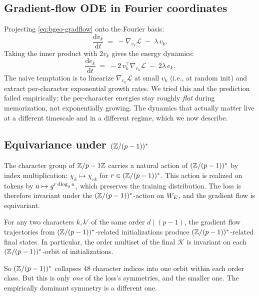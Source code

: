 \subsection{Gradient-flow ODE in Fourier coordinates}
\label{subsec:bgeo-flow}

Projecting \eqref{eq:bgeo-gradflow} onto the Fourier basis:
\begin{equation}
  \frac{\mathrm d v_k}{\mathrm d t} \;=\; -\nabla_{v_k} \mathcal L \;-\; \lambda\, v_k.
  \label{eq:bgeo-vdot}
\end{equation}
Taking the inner product with $2 v_k$ gives the energy dynamics:
\begin{equation}
  \frac{\mathrm d e_k}{\mathrm d t} \;=\; -2\,v_k^\top \nabla_{v_k}\mathcal L \;-\; 2\lambda\, e_k.
  \label{eq:bgeo-edot}
\end{equation}
The naive temptation is to linearize $\nabla_{v_k} \mathcal L$ at small
$v_k$ (i.e., at random init) and extract per-character exponential growth
rates.  We tried this and the prediction failed empirically: the per-character
energies stay roughly \emph{flat} during memorization, not exponentially
growing.  The dynamics that actually matter live at a different timescale and
in a different regime, which we now describe.

\subsection{Equivariance under \texorpdfstring{$(\mathbb{Z}/(p-1))^*$}{(Z/(p-1))*}}
\label{subsec:bgeo-equivariance}

The character group of $\mathbb{Z}/p-1\mathbb{Z}$ carries a natural action of $(\mathbb{Z}/(p-1))^*$
by index multiplication: $\chi_k \mapsto \chi_{rk}$ for $r \in (\mathbb{Z}/(p-1))^*$.
This action is realized on tokens by $a \mapsto g^{r \operatorname{dlog}_g a}$, which
preserves the training distribution.  The loss is therefore invariant under
the $(\mathbb{Z}/(p-1))^*$-action on $W_E$, and the gradient flow is equivariant.

\begin{proposition}
\label{prop:bgeo-order-symmetry}
For any two characters $k, k'$ of the same order $d \mid (p-1)$, the gradient
flow trajectories from $(\mathbb{Z}/(p-1))^*$-related initializations produce
$(\mathbb{Z}/(p-1))^*$-related final states.  In particular, the order multiset of
the final $\mathcal K$ is invariant on each $(\mathbb{Z}/(p-1))^*$-orbit of
initializations.
\end{proposition}

\noindent So $(\mathbb{Z}/(p-1))^*$ collapses 48 character indices into one orbit
within each order class.  But this is only \emph{one} of the loss's
symmetries, and the smaller one.  The empirically dominant symmetry is a
different one.

